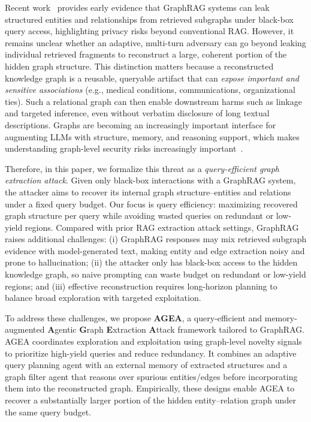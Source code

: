 Recent work~\cite{liu2025exposing} provides early evidence that GraphRAG systems can leak structured entities and relationships from retrieved subgraphs under black-box query access, highlighting privacy risks beyond conventional RAG. 
However, it remains unclear whether an adaptive, multi-turn adversary can go beyond leaking individual retrieved fragments to reconstruct a large, coherent portion of the hidden graph structure. 
This distinction matters because a reconstructed knowledge graph is a reusable, queryable artifact that can \textit{expose important and sensitive associations} (e.g., medical conditions, communications, organizational ties). Such a relational graph can then enable downstream harms such as linkage and targeted inference, even without verbatim disclosure of long textual descriptions. Graphs are becoming an increasingly important interface for augmenting LLMs with structure, memory, and reasoning support, which makes understanding graph-level security risks increasingly important~\cite{wang2025generalizing,he2025self,luo2026graphs,sahu2026knowledge}.


Therefore, in this paper, we formalize this threat as a 
\emph{query-efficient graph extraction attack}. 
Given only black-box interactions with a GraphRAG system, the attacker aims to recover its internal graph structure--entities and relations under a fixed query budget. 
Our focus is query efficiency: maximizing recovered graph structure per query while avoiding wasted queries on redundant or low-yield regions.
Compared with prior RAG extraction attack settings, GraphRAG raises additional challenges: (i) GraphRAG responses may mix retrieved subgraph evidence with model-generated text, making entity and edge extraction noisy and prone to hallucination;
(ii) the attacker only has black-box access to the hidden knowledge graph, so naive prompting can waste budget on redundant or low-yield regions; and (iii) effective reconstruction requires long-horizon planning to balance broad exploration with targeted exploitation.

To address these challenges, we propose \textbf{AGEA}, a query-efficient and memory-augmented \textbf{A}gentic \textbf{G}raph \textbf{E}xtraction \textbf{A}ttack framework tailored to GraphRAG.
AGEA coordinates exploration and exploitation using graph-level novelty signals to prioritize high-yield queries and reduce redundancy. It combines an adaptive query planning agent with an external memory of extracted structures and a graph filter agent that reasons over spurious entities/edges before incorporating them into the reconstructed graph. Empirically, these designs enable AGEA to recover a substantially larger portion of the hidden entity–relation graph under the same query budget. 

